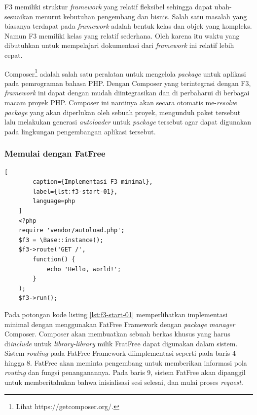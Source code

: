     F3 memiliki struktur \textit{framework} yang relatif fleksibel sehingga dapat
    ubah-sesuaikan menurut kebutuhan pengembang dan bisnis. Salah satu masalah
    yang biasanya terdapat pada \textit{framework} adalah bentuk kelas dan objek
    yang kompleks. Namun F3 memiliki kelas yang relatif
    sederhana\cite{fatfree:docs-api}. Oleh karena itu waktu yang dibutuhkan
    untuk mempelajari dokumentasi dari \textit{framework} ini relatif lebih cepat.
    
    Composer\footnote{Lihat https://getcomposer.org/.} adalah salah satu
    peralatan untuk mengelola \textit{package} untuk aplikasi pada pemrograman
    bahasa PHP. Dengan Composer yang terintegrasi dengan F3, \textit{framework}
    ini dapat dengan mudah diintegrasikan dan di perbaharui di berbagai macam
    proyek PHP. Composer ini nantinya akan secara otomatis me-\textit{resolve}
    \textit{package} yang akan diperlukan oleh sebuah proyek, mengunduh paket
    tersebut lalu melakukan generasi \textit{autoloader} untuk \textit{package}
    tersebut agar dapat digunakan pada lingkungan pengembangan aplikasi tersebut.

    \subsubsection{Memulai dengan FatFree}
    
    \begin{lstlisting}[
        caption={Implementasi F3 minimal},
        label={lst:f3-start-01},
        language=php
    ]
    <?php
    require 'vendor/autoload.php';
    $f3 = \Base::instance();
    $f3->route('GET /',
        function() {
            echo 'Hello, world!';
        }
    );
    $f3->run();
    \end{lstlisting}
    
    Pada potongan kode listing \ref{lst:f3-start-01} memperlihatkan implementasi
    minimal dengan menggunakan FatFree Framework dengan \textit{package manager}
    Composer. Composer akan membuatkan sebuah berkas khusus yang harus
    di\textit{include} untuk \textit{library-library} milik FratFree dapat
    digunakan dalam sistem. Sistem \textit{routing} pada FatFree Framework
    diimplementasi seperti pada baris 4 hingga 8. FatFree akan meminta
    pengembang untuk memberikan informasi pola \textit{routing} dan fungsi
    penanganannya. Pada baris 9, sistem FatFree akan dipanggil untuk
    memberitahukan bahwa inisialisasi sesi selesai, dan mulai proses
    \textit{request}.
    
